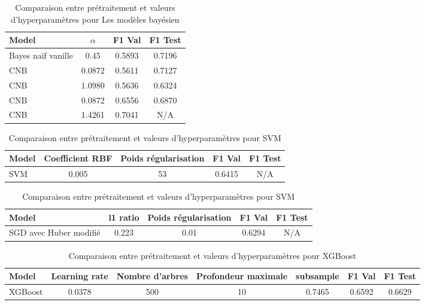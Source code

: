 \documentclass{article}
\begin{document}
\begin{table}[H]
    \centering
    \begin{tabular}{|l|c|c|c|}
        \hline
        \textbf{Model} & \textbf{$\alpha$} &
        \textbf{F1 Val} &
        \textbf{F1 Test}\\
        \hline
        Bayes naïf vanille & 0.45 & 0.5893 & 0.7196\\
        CNB & 0.0872 & 0.5611 & 0.7127\\
        CNB & 1.0980 & 0.5636 & 0.6324\\
        CNB & 0.0872 & 0.6556 & 0.6870\\
        CNB & 1.4261 & 0.7041 & N/A\\
        \hline
    \end{tabular}
    \caption{Comparaison entre prétraitement et valeurs d'hyperparamètres pour Les modèles bayésien}
    \label{tab:model_comparison}
\end{table}
\begin{table}[H]
    \centering
    \begin{tabular}{|l|c|c|c|c|}
        \hline
        \textbf{Model} & \textbf{Coefficient RBF} & \textbf{Poids régularisation} &
        \textbf{F1 Val} &
        \textbf{F1 Test}
        \\
        \hline
        SVM & 0.005 & 53 & 0.6415 & N/A\\
        \hline
    \end{tabular}
    \caption{Comparaison entre prétraitement et valeurs d'hyperparamètres pour SVM}
    \label{tab:model_comparison}
\end{table}
\begin{table}[H]
    \centering
    \begin{tabular}{|l|c|c|c|c|}
        \hline
        \textbf{Model} & \textbf{l1 ratio} & \textbf{Poids régularisation} & \textbf{F1 Val} &
        \textbf{F1 Test}\\
        \hline
        SGD avec Huber modifié & 0.223 & 0.01 & 0.6294 & N/A\\
        \hline
    \end{tabular}
    \caption{Comparaison entre prétraitement et valeurs d'hyperparamètres pour SVM}
    \label{tab:model_comparison}
\end{table}
\begin{table}[H]
    \centering
    \begin{tabular}{|l|c|c|c|c|c|c|}
        \hline
        \textbf{Model} & \textbf{Learning rate} & \textbf{Nombre d'arbres} &
        \textbf{Profondeur maximale} &
        \textbf{subsample} &
        \textbf{F1 Val} &
        \textbf{F1 Test} \\
        \hline
        XGBoost & 0.0378 & 500 & 10 & 0.7465 & 0.6592 & 0.6629\\
        \hline
    \end{tabular}
    \caption{Comparaison entre prétraitement et valeurs d'hyperparamètres pour XGBoost}
    \label{tab:model_comparison}
\end{table}
\end{document}
